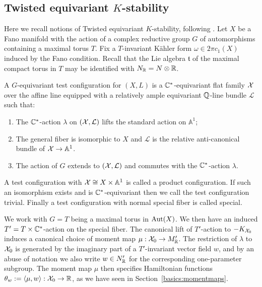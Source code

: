 \subsection{Twisted equivariant $K$-stability}
\label{prelim:twisted}
Here we recall notions of Twisted equivariant $K$-stability, following \cite{datar2016kahler}. Let \(X\) be a Fano manifold with the action of a complex reductive group \(G\) of automorphisms containing a maximal torus \(T\). Fix a \(T\)-invariant K\"ahler form \(\omega \in 2 \pi c_1(X)\) induced by the Fano condition. Recall that the Lie algebra \(\mathfrak{t}\) of the maximal compact torus in \(T\) may be identified with \(N_{\mathbb{R}} = N \otimes \mathbb{R}\).
\begin{definition}
A \(G\)-equivariant test configuration for \((X,L)\) is a \(\mathbb{C}^*\)-equivariant flat family \({\mathcal{X}}\) over the affine line equipped with a relatively ample equivariant \(\mathbb{Q}\)-line bundle \(\mathcal{L}\) such that:
\begin{enumerate}
\item The \(\mathbb{C}^*\)-action \(\lambda\) on \(({\mathcal{X}}, \mathcal{L})\) lifts the standard action on \(\mathbb{A}^1\);
\item The general fiber is isomorphic to \(X\) and \(\mathcal{L}\) is the relative anti-canonical bundle of \({\mathcal{X}} \to \mathbb{A}^1\).
\item The action of \(G\) extends to \(({\mathcal{X}},\mathcal{L})\) and commutes with the \(\mathbb{C}^*\)-action \(\lambda\).
\end{enumerate}
A test configuration with \({\mathcal{X}} \cong X \times \mathbb{A}^1\) is called a product configuration. If such an isomorphism exists and is \(\mathbb{C}^*\)-equivariant then we call the test configuration trivial. Finally a test configuration with normal special fiber is called special.
\end{definition}
We work with \(G = T\) being a maximal torus in \(\mathop{\rm Aut}\nolimits(X)\). We then have an induced \(T' = T \times \mathbb{C}^*\)-action on the special fiber. The canonical lift of \(T'\)-action to \(-K_{{\mathcal{X}}_0}\) induces a canonical choice of moment map \(\mu: {\mathcal{X}}_0 \to M_{\mathbb{R}}'\). The restriction of \(\lambda\) to \({\mathcal{X}}_0\) is generated by the imaginary part of a \(T'\)-invariant vector field \(w\), and by an abuse of notation we also write \(w \in N'_{\mathbb{R}}\) for the corresponding  one-parameter subgroup. The moment map \(\mu\) then specifies Hamiltonian functions \(\theta_w := \langle \mu, w \rangle: {\mathcal{X}}_0 \to \mathbb{R}  \), as we have seen in Section~\ref{basics:momentmaps}.


